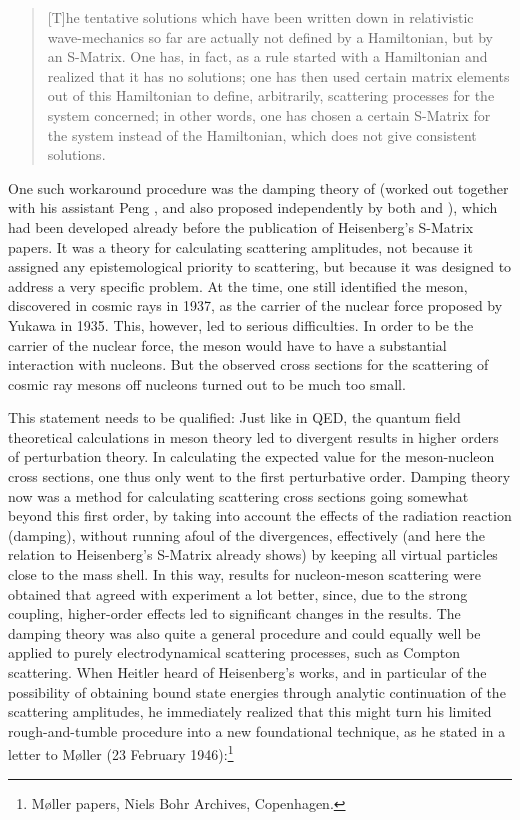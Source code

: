 \documentclass[12pt,a4paper]{article}
\begin{document}
\begin{quote}
[T]he tentative solutions which have been written down in relativistic wave-mechanics so far are actually not defined by a Hamiltonian, but by an S-Matrix. One has, in fact, as a rule started with a Hamiltonian and realized that it has no solutions; one has then used certain matrix elements out of this Hamiltonian to define, arbitrarily, scattering processes for the system concerned; in other words, one has chosen a certain S-Matrix for the system instead of the Hamiltonian, which does not give consistent solutions.
\end{quote}

One such workaround procedure was the damping theory of \citet{heitler_1941_the-influence} (worked out together with his assistant Peng \citep{heitler_1942_the-influence}, and also proposed independently by both \citet{wilson_1941_the-quantum} and \citet{gora_1942_quantentheorie}), which had been developed already before the publication of Heisenberg's S-Matrix papers. It was a theory for calculating scattering amplitudes, not because it assigned any epistemological priority to scattering, but because it was designed to address a very specific problem. At the time, one still identified the meson, discovered in cosmic rays in 1937, as the carrier of the nuclear force proposed by Yukawa in 1935. This, however, led to serious difficulties. In order to be the carrier of the nuclear force, the meson would have to have a substantial interaction with nucleons. But the observed cross sections for the scattering of cosmic ray mesons off nucleons turned out to be much too small.

This statement needs to be qualified: Just like in QED, the quantum field theoretical calculations in meson theory led to divergent results in higher orders of perturbation theory. In calculating the expected value for the meson-nucleon cross sections, one thus only went to the first perturbative order. Damping theory now was a method for calculating scattering cross sections going somewhat beyond this first order, by taking into account the effects of the radiation reaction (damping), without running afoul of the divergences, effectively (and here the relation to Heisenberg's S-Matrix already shows) by keeping all virtual particles close to the mass shell. In this way, results for nucleon-meson scattering were obtained that agreed with experiment a lot better, since, due to the strong coupling, higher-order effects led to significant changes in the results. The damping theory was also quite a general procedure and could equally well be applied to purely electrodynamical scattering processes, such as Compton scattering. When Heitler heard of Heisenberg's works, and in particular of the possibility of obtaining bound state energies through analytic continuation of the scattering amplitudes, he immediately realized that this might turn his limited rough-and-tumble procedure into a new foundational technique, as he stated in a letter to M\o ller (23 February 1946):\footnote{M\o ller papers, Niels Bohr Archives, Copenhagen.}
\end{document}
